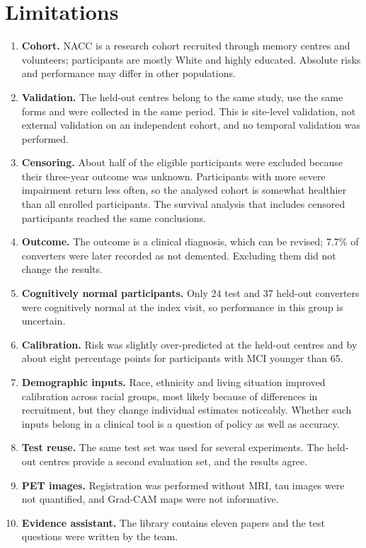 \section{Limitations}

\begin{enumerate}
\item \textbf{Cohort.} NACC is a research cohort recruited through memory centres and volunteers; participants are mostly White and highly educated. Absolute risks and performance may differ in other populations.
\item \textbf{Validation.} The held-out centres belong to the same study, use the same forms and were collected in the same period. This is site-level validation, not external validation on an independent cohort, and no temporal validation was performed.
\item \textbf{Censoring.} About half of the eligible participants were excluded because their three-year outcome was unknown. Participants with more severe impairment return less often, so the analysed cohort is somewhat healthier than all enrolled participants. The survival analysis that includes censored participants reached the same conclusions.
\item \textbf{Outcome.} The outcome is a clinical diagnosis, which can be revised; 7.7\% of converters were later recorded as not demented. Excluding them did not change the results.
\item \textbf{Cognitively normal participants.} Only 24 test and 37 held-out converters were cognitively normal at the index visit, so performance in this group is uncertain.
\item \textbf{Calibration.} Risk was slightly over-predicted at the held-out centres and by about eight percentage points for participants with MCI younger than 65.
\item \textbf{Demographic inputs.} Race, ethnicity and living situation improved calibration across racial groups, most likely because of differences in recruitment, but they change individual estimates noticeably. Whether such inputs belong in a clinical tool is a question of policy as well as accuracy.
\item \textbf{Test reuse.} The same test set was used for several experiments. The held-out centres provide a second evaluation set, and the results agree.
\item \textbf{PET images.} Registration was performed without MRI, tau images were not quantified, and Grad-CAM maps were not informative.
\item \textbf{Evidence assistant.} The library contains eleven papers and the test questions were written by the team.
\end{enumerate}

